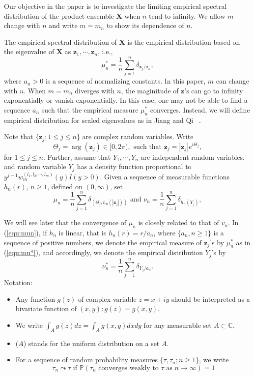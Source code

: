 \documentclass[12pt]{article}
\theoremstyle{plain}
\theoremstyle{definition}
\theoremstyle{remark}
\begin{document}
Our objective in the paper is to investigate the limiting empirical
spectral distribution of the product ensemble $\mathbf{X}$ when $n$
tend to infinity. We allow $m$ change with $n$ and write $m=m_n$ to
show its dependence of $n$.


The empirical spectral distribution of $\mathbf{X}$ is the empirical distribution based on the eigenvalue of $\mathbf{X}$ as $\mathbf{z}_{1}, \cdots, \mathbf{z}_{n}$, i.e.,
\begin{equation}\label{equ:mu*}
\mu^*_n=\frac{1}{n}\sum_{j=1}^n \delta_{\mathbf{z}_j/a_n},
\end{equation}
where $a_n>0$ is a sequence of normalizing constants. In this paper,
$m$ can change with $n$. When $m=m_n$ diverges with $n$, the
maginitude of $\mathbf{z}$'s can go to infinity exponentially or
vanish exponentially. In this case, one may not be able to find a
sequence $a_n$ such that the empirical measure $\mu_n^*$ converges.
Instead, we will define empirical distribution for scaled
eigenvalues as in Jiang and Qi ~\cite{JiangQi2019}.

Note that $\{ \mathbf{z}_j;1\leq j\leq n \}$ are complex random variables. Write
$$
\Theta_j=\arg(\mathbf{z}_j)\in[0,2\pi), \text{ such that }\mathbf{z}_j=|\mathbf{z}_j|e^{i\Theta_j},
$$
for $1\leq j\leq n$. Further, assume that $Y_1,\cdots,Y_n$ are independent random variables, and random variable $Y_j$ has a density function proportional to $y^{j-1}w_m^{(l_1,l_2,\cdots,l_m)}(y)I(y>0)$. Given a sequence of measurable functions $h_n(r)$, $n\geq 1$, defined on $(0,\infty)$, set
\begin{equation}\label{equ:mun}
\mu_{n}=\frac{1}{n} \sum_{j=1}^{n} \delta_{\left(\Theta_{j}, h_{n}\left(\left|\mathbf{z}_{j}\right|\right)\right)} \text { and } \nu_{n}=\frac{1}{n} \sum_{j=1}^{n} \delta_{h_{n}\left({Y_{j}}\right)},
\end{equation}

We will see later that the convergence of $\mu_n$ is closely related to that of $v_n$. In (\ref{equ:mun}), if $h_n$ is linear, that is $h_n(r)=r/a_n$, where $\{ a_n,n\geq 1 \}$ is a sequence of positive numbers, we denote the empirical measure of $\mathbf{z}_j$'s by $\mu_n^*$ as in (\ref{equ:mu*}), and accordingly, we denote the empirical distribution $Y_j$'s by
$$
\nu_n^*=\frac{1}{n} \sum_{j=1}^{n} \delta_{{Y_{j}}/a_n}.
$$
Notation:
\begin{itemize}
    \item Any function $g(z)$ of complex variable $z=x+iy$ should be interpreted as a bivariate function of $(x,y):g(z)=g(x,y)$.
    \item We write $\int_Ag(z)dz=\int_Ag(x,y)dxdy$ for any measurable set $A\subset \mathbb{C}$.
    \item {}($A$) stands for the uniform distribution on a set $A$.
    \item For a sequence of random probability measures $\{ \tau,\tau_n;n\geq 1 \}$, we write
    \begin{equation}\label{equ:leadsto converge}
    \tau_{n} \leadsto \tau \text { if } \mathbb{P}\left(\tau_{n} \text { converges weakly to } \tau \text { as } n \rightarrow \infty\right)=1
    \end{equation}
\end{itemize}
\end{document}
